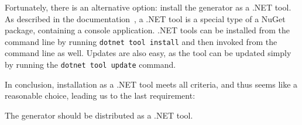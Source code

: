 Fortunately, there is an alternative option: install the generator as a .NET tool.
As described in the documentation~\cite{dotnet_tools}, a .NET tool is a special type of a NuGet package, containing a console application.
.NET tools can be installed from the command line by running \texttt{dotnet tool install} and then invoked from the command line as well.
Updates are also easy, as the tool can be updated simply by running the \texttt{dotnet tool update} command.

In conclusion, installation as a .NET tool meets all criteria, and thus seems like a reasonable choice, leading us to the last requirement:

\begin{requirement}
    The generator should be distributed as a .NET tool.
    \label{req:dotnet-tool-dist}
\end{requirement}
